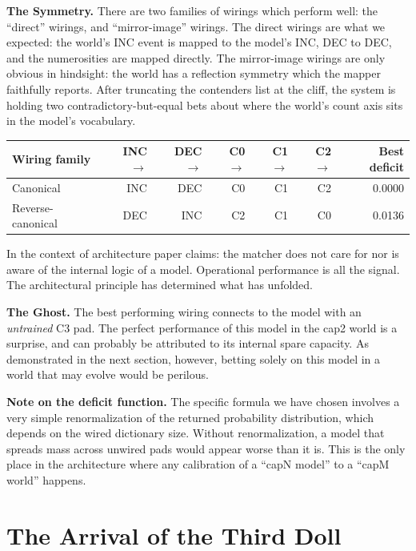 \documentclass[12pt, a4paper]{article}
\begin{document}
\textbf{The Symmetry.} There are two families of wirings which perform well:
the ``direct'' wirings, and ``mirror-image'' wirings. The direct wirings are
what we expected: the world's INC event is mapped to the model's INC, DEC to
DEC, and the numerosities are mapped directly. The mirror-image wirings are
only obvious in hindsight: the world has a reflection symmetry which the mapper
faithfully reports. After truncating the contenders list at the cliff, the
system is holding two contradictory-but-equal bets about where the world's
count axis sits in the model's vocabulary.

\begin{center}
\begin{tabular}{lrrrrrr}
\toprule
Wiring family & INC$\to$ & DEC$\to$ & C0$\to$ & C1$\to$ & C2$\to$ & Best deficit \\
\midrule
Canonical         & INC & DEC & C0 & C1 & C2 & 0.0000 \\
Reverse-canonical & DEC & INC & C2 & C1 & C0 & 0.0136 \\
\bottomrule
\end{tabular}
\end{center}

In the context of architecture paper claims: the matcher does not care for nor
is aware of the internal logic of a model. Operational performance is all the
signal. The architectural principle has determined what has unfolded.

\textbf{The Ghost.} The best performing wiring connects to the model with an
\textit{untrained} C3 pad. The perfect performance of this model in the cap2
world is a surprise, and can probably be attributed to its internal spare
capacity. As demonstrated in the next section, however, betting solely on this
model in a world that may evolve would be perilous.

\textbf{Note on the deficit function.} The specific formula we have chosen
involves a very simple renormalization of the returned probability distribution,
which depends on the wired dictionary size. Without renormalization, a model
that spreads mass across unwired pads would appear worse than it is. This is
the only place in the architecture where any calibration of a ``capN model''
to a ``capM world'' happens.

\section{The Arrival of the Third Doll}
\label{sec:thirddoll}
\end{document}
